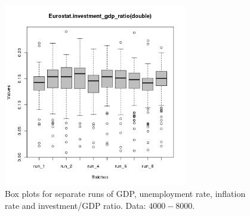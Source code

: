 \begin{figure}[ht!]
\begin{minipage}{17cm}
\includegraphics[width=8cm]{./batch/tax_0.05/Eurostat-investment_gdp_ratio-runbatch.png}
\end{minipage}
\caption{Box plots for separate runs of GDP, unemployment rate, inflation rate and investment/GDP ratio. Data: $4000-8000$.}
\label{Figure: run batch}
\end{figure}
